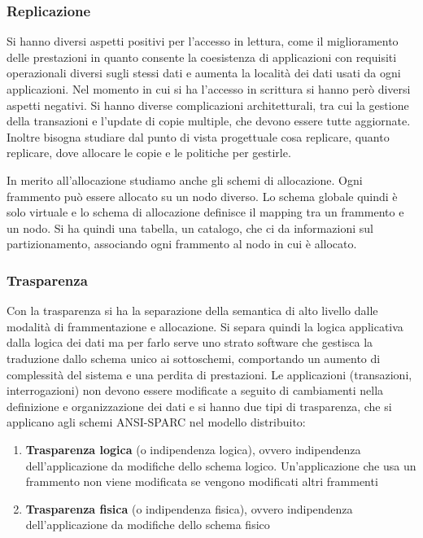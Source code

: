 \subsubsection{Replicazione}
Si hanno diversi aspetti positivi per l'accesso in lettura, come il miglioramento
delle prestazioni in quanto consente la coesistenza di applicazioni con requisiti
operazionali diversi sugli stessi dati e aumenta la località dei dati usati da
ogni applicazioni. Nel momento in cui si ha l'accesso in scrittura si hanno però
diversi aspetti negativi. Si hanno diverse complicazioni architetturali, tra cui
la gestione della transazioni e l'update di copie multiple, che devono essere
tutte aggiornate. Inoltre bisogna studiare dal punto di vista progettuale cosa
replicare, quanto replicare, dove allocare le copie e le politiche per gestirle.

In merito all'allocazione studiamo anche gli schemi di allocazione. Ogni
frammento può essere allocato su un nodo diverso. Lo schema globale quindi
è solo virtuale e lo schema di allocazione definisce il mapping tra un frammento
e un nodo. Si ha quindi una tabella, un catalogo, che ci da informazioni sul
partizionamento, associando ogni frammento al nodo in cui è allocato.
\subsubsection{Trasparenza}
Con la trasparenza si ha la separazione della semantica di alto livello dalle
modalità di frammentazione e allocazione. Si separa quindi la logica applicativa
dalla logica dei dati ma per farlo serve uno strato software che gestisca la
traduzione dallo schema unico ai sottoschemi, comportando un aumento di
complessità del sistema e una perdita di prestazioni.
Le applicazioni (transazioni, interrogazioni) non devono essere modificate a
seguito di cambiamenti nella definizione e organizzazione dei dati e si hanno
due tipi di trasparenza, che si applicano agli schemi ANSI-SPARC nel
modello distribuito:
\begin{enumerate}
    \item \textbf{Trasparenza logica} (o indipendenza logica), ovvero indipendenza
          dell'applicazione da modifiche dello schema logico. Un'applicazione
          che usa un frammento non viene modificata se vengono modificati altri
          frammenti
    \item \textbf{Trasparenza fisica} (o indipendenza fisica), ovvero indipendenza
          dell'applicazione da modifiche dello schema fisico
\end{enumerate}

